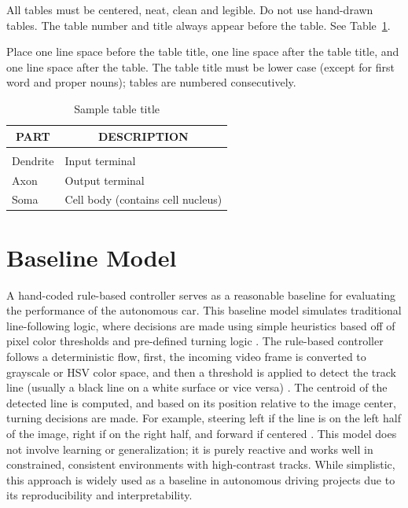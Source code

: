 \documentclass{article} %
\begin{document}
All tables must be centered, neat, clean and legible. Do not use hand-drawn
tables. The table number and title always appear before the table. See
Table~\ref{sample-table}.

Place one line space before the table title, one line space after the table
title, and one line space after the table. The table title must be lower case
(except for first word and proper nouns); tables are numbered consecutively.

\begin{table}[t]
\caption{Sample table title}
\label{sample-table}
\begin{center}
\begin{tabular}{ll}
\multicolumn{1}{c}{\bf PART}  &\multicolumn{1}{c}{\bf DESCRIPTION}
\\ \hline \\
Dendrite         &Input terminal \\
Axon             &Output terminal \\
Soma             &Cell body (contains cell nucleus) \\
\end{tabular}
\end{center}
\end{table}



\section{Baseline Model}

A hand-coded rule-based controller serves as a reasonable baseline for evaluating the performance of the autonomous car. 
This baseline model simulates traditional line-following logic, where decisions are made using simple heuristics based off of 
pixel color thresholds and pre-defined turning logic \citep{LIKMETA2020103568}. The rule-based controller follows a deterministic flow, first, the incoming 
video frame is converted to grayscale or HSV color space, and then a threshold is applied to detect the track line (usually a black line 
on a white surface or vice versa) \citep{LIKMETA2020103568}. The centroid of the detected line is computed, and based on its position relative to the image center, 
turning decisions are made. For example, steering left if the line is on the left half of the image, right if on the right half, and forward if 
centered \citep{bojarski2016endendlearningselfdriving}. This model does not involve learning or generalization; it is purely reactive and works well in constrained, consistent environments 
with high-contrast tracks. While simplistic, this approach is widely used as a baseline in autonomous driving projects due to its reproducibility 
and interpretability.
\end{document}

